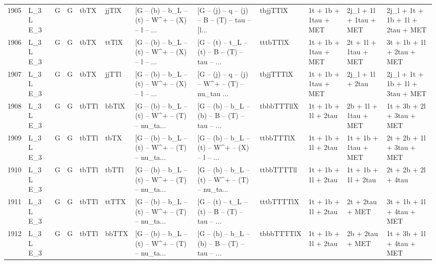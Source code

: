 \begin{tabular}{llllllllllll}
1905 &    L\_3 L E\_3 &     G &     G &        tbTX &       jjTlX &  [G -- (b) -- b\_L -- (t) -- W\textasciicircum + -- (X) -- l -- ... &  [G -- (j) -- q -- (j) -- B -- (T) -- tau -- [l... &    tbjjTTlX &     1t + 1b + 1tau + MET &   2j\_l + 1l + 1tau + MET &   2j\_l + 1t + 1b + 1l + 2tau + MET \\
1906 &    L\_3 L E\_3 &     G &     G &        tbTX &       ttTlX &  [G -- (b) -- b\_L -- (t) -- W\textasciicircum + -- (X) -- l -- ... &  [G -- (t) -- t\_L -- (t) -- B -- (T) -- tau -- ... &    tttbTTlX &     1t + 1b + 1tau + MET &     2t + 1l + 1tau + MET &          3t + 1b + 1l + 2tau + MET \\
1907 &    L\_3 L E\_3 &     G &     G &        tbTX &       jjTTl &  [G -- (b) -- b\_L -- (t) -- W\textasciicircum + -- (X) -- l -- ... &  [G -- (j) -- q -- (j) -- W\textasciicircum + -- (T) -- nu\_tau ... &   tbjjTTTlX &     1t + 1b + 1tau + MET &         2j\_l + 1l + 2tau &   2j\_l + 1t + 1b + 1l + 3tau + MET \\
1908 &    L\_3 L E\_3 &     G &     G &       tbTTl &       bbTlX &  [G -- (b) -- b\_L -- (t) -- W\textasciicircum + -- (T) -- nu\_ta... &  [G -- (b) -- b\_L -- (b) -- B -- (T) -- tau -- ... &  tbbbTTTllX &      1t + 1b + 1l + 2tau &     2b + 1l + 1tau + MET &          1t + 3b + 2l + 3tau + MET \\
1909 &    L\_3 L E\_3 &     G &     G &       tbTTl &        tbTX &  [G -- (b) -- b\_L -- (t) -- W\textasciicircum + -- (T) -- nu\_ta... &  [G -- (b) -- b\_L -- (t) -- W\textasciicircum + -- (X) -- l -- ... &   ttbbTTTlX &      1t + 1b + 1l + 2tau &     1t + 1b + 1tau + MET &          2t + 2b + 1l + 3tau + MET \\
1910 &    L\_3 L E\_3 &     G &     G &       tbTTl &       tbTTl &  [G -- (b) -- b\_L -- (t) -- W\textasciicircum + -- (T) -- nu\_ta... &  [G -- (b) -- b\_L -- (t) -- W\textasciicircum + -- (T) -- nu\_ta... &  ttbbTTTTll &      1t + 1b + 1l + 2tau &      1t + 1b + 1l + 2tau &                2t + 2b + 2l + 4tau \\
1911 &    L\_3 L E\_3 &     G &     G &       tbTTl &       ttTTX &  [G -- (b) -- b\_L -- (t) -- W\textasciicircum + -- (T) -- nu\_ta... &  [G -- (t) -- t\_L -- (t) -- B -- (T) -- tau -- ... &  tttbTTTTlX &      1t + 1b + 1l + 2tau &          2t + 2tau + MET &          3t + 1b + 1l + 4tau + MET \\
1912 &    L\_3 L E\_3 &     G &     G &       tbTTl &       bbTTX &  [G -- (b) -- b\_L -- (t) -- W\textasciicircum + -- (T) -- nu\_ta... &  [G -- (b) -- b\_L -- (b) -- B -- (T) -- tau -- ... &  tbbbTTTTlX &      1t + 1b + 1l + 2tau &          2b + 2tau + MET &          1t + 3b + 1l + 4tau + MET \\

\end{tabular}
